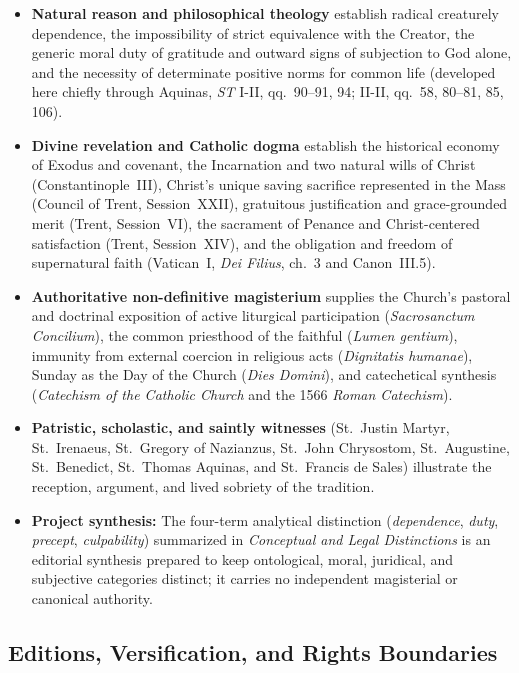 \begin{itemize}
\item \textbf{Natural reason and philosophical theology} establish radical creaturely dependence, the impossibility of strict equivalence with the Creator, the generic moral duty of gratitude and outward signs of subjection to God alone, and the necessity of determinate positive norms for common life (developed here chiefly through Aquinas, \emph{ST} I-II, qq.\ 90--91, 94; II-II, qq.\ 58, 80--81, 85, 106).
\item \textbf{Divine revelation and Catholic dogma} establish the historical economy of Exodus and covenant, the Incarnation and two natural wills of Christ (Constantinople~III), Christ's unique saving sacrifice represented in the Mass (Council of Trent, Session~XXII), gratuitous justification and grace-grounded merit (Trent, Session~VI), the sacrament of Penance and Christ-centered satisfaction (Trent, Session~XIV), and the obligation and freedom of supernatural faith (Vatican~I, \emph{Dei Filius}, ch.\ 3 and Canon~III.5).
\item \textbf{Authoritative non-definitive magisterium} supplies the Church's pastoral and doctrinal exposition of active liturgical participation (\emph{Sacrosanctum Concilium}), the common priesthood of the faithful (\emph{Lumen gentium}), immunity from external coercion in religious acts (\emph{Dignitatis humanae}), Sunday as the Day of the Church (\emph{Dies Domini}), and catechetical synthesis (\emph{Catechism of the Catholic Church} and the 1566 \emph{Roman Catechism}).
\item \textbf{Patristic, scholastic, and saintly witnesses} (St.\ Justin Martyr, St.\ Irenaeus, St.\ Gregory of Nazianzus, St.\ John Chrysostom, St.\ Augustine, St.\ Benedict, St.\ Thomas Aquinas, and St.\ Francis de Sales) illustrate the reception, argument, and lived sobriety of the tradition.
\item \textbf{Project synthesis:} The four-term analytical distinction (\emph{dependence}, \emph{duty}, \emph{precept}, \emph{culpability}) summarized in \emph{Conceptual and Legal Distinctions} is an editorial synthesis prepared to keep ontological, moral, juridical, and subjective categories distinct; it carries no independent magisterial or canonical authority.
\end{itemize}

\subsection*{Editions, Versification, and Rights Boundaries}

